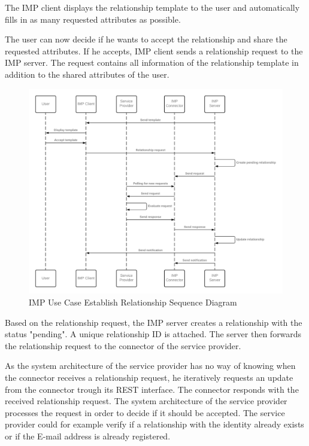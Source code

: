 The IMP client displays the relationship template to the user and automatically fills in as many requested attributes as possible.

The user can now decide if he wants to accept the relationship and share the requested attributes. If he accepts, IMP client sends a relationship request to the IMP server. The request contains all information of the relationship template in addition to the shared attributes of the user.

\begin{figure}[h]
    \centering
    \caption{IMP Use Case Establish Relationship Sequence Diagram}
    \includegraphics[scale=0.3]{Diagrams/IMP Use Case Establish Relationship Sequence Diagram 2.png}
\end{figure}

Based on the relationship request, the IMP server creates a relationship with the status "pending". A unique relationship ID is attached. The server then forwards the relationship request to the connector of the service provider.

As the system architecture of the service provider has no way of knowing when the connector receives a relationship request, he iteratively requests an update from the connector trough its REST interface. The connector responds with the received relationship request. The system architecture of the service provider processes the request in order to decide if it should be accepted. The service provider could for example verify if a relationship with the identity already exists or if the E-mail address is already registered.

